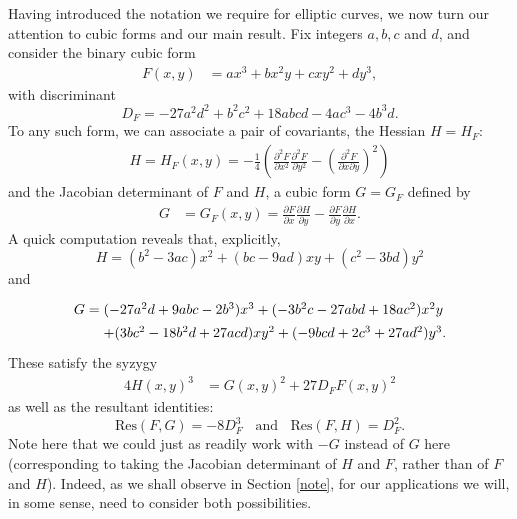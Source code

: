 Having introduced the notation we require for elliptic curves, we now turn our attention to cubic forms and our main result. Fix integers $a, b, 
c$ and $d$, and consider the binary cubic form 
\begin{align} \label{form0}
F(x,y)&=ax^3+bx^2y+cxy^2+dy^3,
\end{align}
with discriminant
\begin{equation} \label{claire-bear}
D_F = -27 a^2 d^2 + b^2 c^2 + 18 abcd -4 ac^3 -4 b^3 d.
\end{equation}
To any such form, we can associate a pair of covariants, the Hessian  $H=H_F$:
\begin{align*}
H=  H_F (x,y)=  - \frac{1}{4} \left(\frac{\partial^2 F}{\partial x^2} \frac{\partial^2 F}{\partial y^2} - 
\left(\frac{\partial^2 F}{\partial x \partial y}\right)^2 \right) 
\end{align*}
and the Jacobian determinant of $F$ and $H$,  a cubic form $G=G_F$ defined by
\begin{align*}
G&=G_F (x,y)=\frac{\partial F}{\partial x}\frac{\partial H}{\partial y}-  \frac{\partial F}{\partial y} \frac{\partial 
H}{\partial x}.
\end{align*}
A quick computation reveals that, explicitly, 
$$
H= (b^2-3ac) x^2 + (bc-9ad) xy + (c^2-3bd) y^2  
$$
and
$$
\arraycolsep=1.4pt\def\arraystretch{1.4}
\begin{array}{ll}
G = & (-27 a^2d+9abc-2b^3)  x^3 + (-3b^2c-27 abd+18ac^2) x^2 y \\
   & + (3bc^2-18b^2d+27acd)  x y^2 + (-9bcd+2c^3+27ad^2) y^3.\\
\end{array}
$$
These satisfy the syzygy
\begin{align} \label{syz}
4H(x,y)^3 &= G(x,y)^2+27D_F F(x,y)^2
\end{align}
as well as the resultant identities:
\begin{equation} \label{resultant}
\mbox{Res} (F,G) = -8 D_F^3 \; \; \mbox{ and } \; \; 
 \mbox{Res} (F,H) = D_F^2.
\end{equation}
Note here that we could just as readily work with $-G$ instead of $G$ here (corresponding to taking the Jacobian determinant of $H$ and $F$, rather than of $F$ and $H$). Indeed, as we shall observe in Section \ref{note}, for our applications we will, in some sense, need to consider both possibilities.

